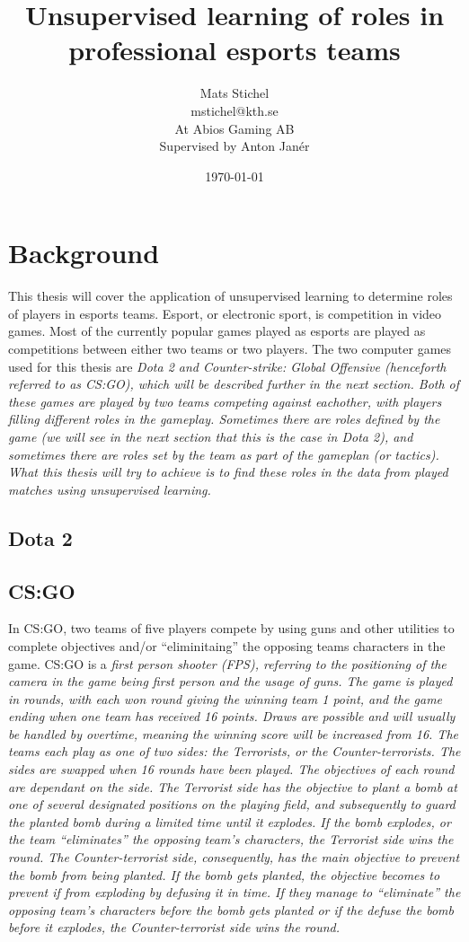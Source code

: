 \documentclass{article}
\title{Unsupervised learning of roles in professional esports teams}
\author{Mats Stichel \\ mstichel@kth.se \\ At Abios Gaming AB \\ Supervised by Anton Janér}
\date{\today}
\begin{document}
\maketitle

\section{Background}
This thesis will cover the application of unsupervised learning to determine roles of players in esports teams. Esport, or electronic sport, is competition in video games. Most of the currently popular games played as esports are played as competitions between either two teams or two players. The two computer games used for this thesis are \it{Dota 2} and \it{Counter-strike: Global Offensive} (henceforth referred to as CS:GO), which will be described further in the next section. Both of these games are played by two teams competing against eachother, with players filling different roles in the gameplay. Sometimes there are roles defined by the game (we will see in the next section that this is the case in Dota 2), and sometimes there are roles set by the team as part of the gameplan (or tactics). What this thesis will try to achieve is to find these roles in the data from played matches using unsupervised learning.

\subsection{Dota 2}


\subsection{CS:GO}
In CS:GO, two teams of five players compete by using guns and other utilities to complete objectives and/or ``eliminitaing'' the opposing teams characters in the game. CS:GO is a \it{first person shooter} (FPS), referring to the positioning of the camera in the game being first person and the usage of guns. The game is played in rounds, with each won round giving the winning team 1 point, and the game ending when one team has received 16 points. Draws are possible and will usually be handled by overtime, meaning the winning score will be increased from 16. The teams each play as one of two sides: the \it{Terrorists}, or the \it{Counter-terrorists}. The sides are swapped when 16 rounds have been played. The objectives of each round are dependant on the side. The \it{Terrorist} side has the objective to plant a bomb at one of several designated positions on the playing field, and subsequently to guard the planted bomb during a limited time until it explodes. If the bomb explodes, or the team ``eliminates'' the opposing team's characters, the \it{Terrorist} side wins the round. The \it{Counter-terrorist} side, consequently, has the main objective to prevent the bomb from being planted. If the bomb gets planted, the objective becomes to prevent if from exploding by defusing it in time. If they manage to ``eliminate'' the opposing team's characters before the bomb gets planted \it{or} if the defuse the bomb before it explodes, the \it{Counter-terrorist} side wins the round.
\end{document}

